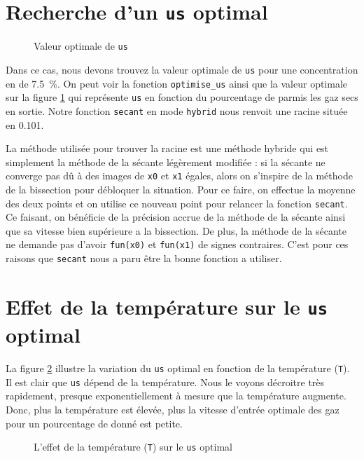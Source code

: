 \documentclass[11pt]{report}
\begin{document}
        \section{Recherche d'un \texttt{us} optimal}
            \begin{figure}[ht]
                \centering
                
                \caption{Valeur optimale de \texttt{us}}
                \label{graph:us}
            \end{figure}
            Dans ce cas, nous devons trouvez la valeur optimale de \verb|us| pour une concentration
            en  de \SI{7.5}{\percent}.
            On peut voir la fonction \verb|optimise_us| ainsi que la valeur optimale sur la figure \ref{graph:us}
            qui représente \verb|us| en fonction du pourcentage de  parmis les gaz secs en sortie.
            Notre fonction \verb|secant| en mode \verb|hybrid| nous renvoit une racine située en 0.101.
            \par
            La méthode utilisée pour trouver la racine est une méthode hybride qui est simplement
            la méthode de la sécante légèrement modifiée : si la sécante ne converge pas dû à des
            images de \verb|x0| et \verb|x1| égales,
            alors on s'inspire de la méthode de la bissection pour  débloquer la situation.
            Pour ce faire, on effectue la moyenne des deux points et on utilise ce nouveau point pour relancer
            la fonction \verb|secant|. Ce faisant, on bénéficie de la précision accrue de la méthode de la sécante
            ainsi que sa vitesse bien supérieure a la bissection. De plus, la méthode de la sécante ne demande 
            pas d'avoir \verb|fun(x0)| et \verb|fun(x1)| de signes contraires. C'est pour ces raisons que \verb|secant| nous a 
            paru être la bonne fonction a utiliser.
        \section{Effet de la température sur le \texttt{us} optimal}
            La figure \ref{graph:us/T} illustre la variation du \verb|us| optimal en fonction de la température (\verb|T|).
            Il est clair que \verb|us| dépend de la température. 
            Nous le voyons décroitre très rapidement, presque exponentiellement à mesure que la température augmente.
            Donc, plus la température est élevée, plus la vitesse d'entrée
            optimale des gaz pour un pourcentage de  donné est petite.
            \begin{figure}[ht]
                \centering
                
                \caption{L'effet de la température (\texttt{T}) sur le \texttt{us} optimal}
                \label{graph:us/T}
            \end{figure}
\end{document}
